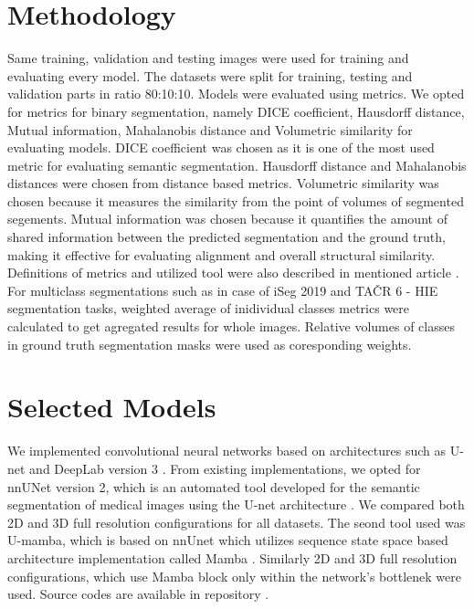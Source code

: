 \documentclass[runningheads]{llncs}
\begin{document}
\section{Methodology}
\label{sec:methodology}
Same training, validation and testing images were used for training and evaluating every model. The datasets were split for training, testing and validation parts in ratio 80:10:10. Models were evaluated using metrics. We opted for metrics for binary segmentation, namely DICE coefficient,  Hausdorff distance, Mutual information, Mahalanobis distance and Volumetric similarity for evaluating models. DICE coefficient was chosen as it is one of the most used metric \cite{metrics_for_evaluating} for evaluating semantic segmentation. Hausdorff distance and Mahalanobis distances were chosen from distance based metrics. Volumetric similarity was chosen because it measures the similarity from the point of volumes of segmented segements. Mutual information was chosen because it quantifies the amount of shared information between the predicted segmentation and the ground truth, making it effective for evaluating alignment and overall structural similarity. Definitions of metrics and utilized tool were also described in mentioned article \cite{metrics_for_evaluating}. For multiclass segmentations such as in case of iSeg 2019 and TAČR 6 - HIE segmentation tasks, weighted average of inidividual classes metrics were calculated to get agregated results for whole images. Relative volumes of classes in ground truth segmentation masks were used as coresponding weights.

\section{Selected Models}
\label{sec:models}
We implemented convolutional neural networks based on architectures such as U-net \cite{unet} and DeepLab version 3 \cite{deeplab}. From existing implementations, we opted for nnUNet version 2, which is an automated tool developed for the semantic segmentation of medical images using the U-net architecture \cite{nnunet}. We compared both 2D and 3D full resolution configurations for all datasets. The seond tool used was U-mamba, which is based on nnUnet which utilizes sequence state space based architecture implementation called Mamba \cite{mamba}. Similarly 2D and 3D full resolution configurations,  which use Mamba block only within the network's bottlenek were used. Source codes are available in repository \cite{repository}.
 
\end{document}
